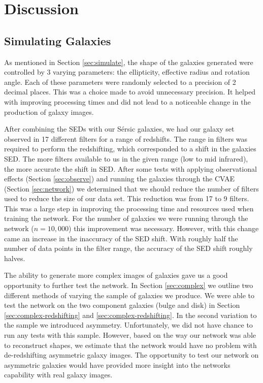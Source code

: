 \documentclass[fleqn,usenatbib]{mnras}
\begin{document}
\section{Discussion}
\label{sec:discussion}

\subsection{Simulating Galaxies} \label{sec:simulate-discussion}
As mentioned in Section \ref{sec:simulate}, the shape of the galaxies generated were controlled by 3 varying parameters: the ellipticity, effective radius and rotation angle. Each of these parameters were randomly selected to a precision of 2 decimal places. This was a choice made to avoid unnecessary precision. It helped with improving processing times and did not lead to a noticeable change in the production of galaxy images.

After combining the SEDs with our S\'ersic galaxies, we had our galaxy set observed in 17 different filters for a range of redshifts. The range in filters was required to perform the redshifting, which corresponded to a shift in the galaxies SED. The more filters available to us in the given range (low to mid infrared), the more accurate the shift in SED. After some tests with applying observational effects (Section \ref{sec:observe}) and running the galaxies through the CVAE (Section \ref{sec:network}) we determined that we should reduce the number of filters used to reduce the size of our data set. This reduction was from 17 to 9 filters. This was a large step in improving the processing time and resources used when training the network. For the number of galaxies we were running through the network ($n = 10,000$) this improvement was necessary. However, with this change came an increase in the inaccuracy of the SED shift. With roughly half the number of data points in the filter range, the accuracy of the SED shift roughly halves.

The ability to generate more complex images of galaxies gave us a good opportunity to further test the network. In Section \ref{sec:complex} we outline two different methods of varying the sample of galaxies we produce. We were able to test the network on the two component galaxies (bulge and disk) in Section \ref{sec:complex-redshifting} and \ref{sec:complex-redshifting}. In the second variation to the sample we introduced asymmetry. Unfortunately, we did not have chance to run any tests with this sample. However, based on the way our network was able to reconstruct shapes, we estimate that the network would have no problem with de-redshifting asymmetric galaxy images. The opportunity to test our network on asymmetric galaxies would have provided more insight into the networks capability with real galaxy images.
\end{document}
